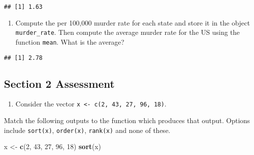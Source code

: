 \documentclass[
]{article}
\newenvironment{Shaded}{\begin{snugshade}}{\end{snugshade}}
\newcommand{\CommentTok}[1]{\textcolor[rgb]{0.56,0.35,0.01}{\textit{#1}}}
\newcommand{\DecValTok}[1]{\textcolor[rgb]{0.00,0.00,0.81}{#1}}
\newcommand{\KeywordTok}[1]{\textcolor[rgb]{0.13,0.29,0.53}{\textbf{#1}}}
\newcommand{\NormalTok}[1]{#1}
\newcommand{\OperatorTok}[1]{\textcolor[rgb]{0.81,0.36,0.00}{\textbf{#1}}}
\newcommand{\StringTok}[1]{\textcolor[rgb]{0.31,0.60,0.02}{#1}}
\providecommand{\tightlist}{%
  \setlength{\itemsep}{0pt}\setlength{\parskip}{0pt}}
\begin{document}
\begin{verbatim}
## [1] 1.63
\end{verbatim}

\begin{enumerate}
\def\labelenumi{\arabic{enumi}.}
\setcounter{enumi}{2}
\tightlist
\item
  Compute the per 100,000 murder rate for each state and store it in the
  object \texttt{murder\_rate}. Then compute the average murder rate for
  the US using the function \texttt{mean}. What is the average?
\end{enumerate}

\begin{Shaded}
\end{Shaded}

\begin{verbatim}
## [1] 2.78
\end{verbatim}

\hypertarget{section-2-assessment}{%
\subsection{Section 2 Assessment}\label{section-2-assessment}}

\begin{enumerate}
\def\labelenumi{\arabic{enumi}.}
\tightlist
\item
  Consider the vector
  \texttt{x\ \textless{}-\ c(2,\ 43,\ 27,\ 96,\ 18)}.
\end{enumerate}

Match the following outputs to the function which produces that output.
Options include \texttt{sort(x)}, \texttt{order(x)}, \texttt{rank(x)}
and none of these.

\begin{Shaded}
\begin{Highlighting}[]
\NormalTok{x <-}\StringTok{ }\KeywordTok{c}\NormalTok{(}\DecValTok{2}\NormalTok{, }\DecValTok{43}\NormalTok{, }\DecValTok{27}\NormalTok{, }\DecValTok{96}\NormalTok{, }\DecValTok{18}\NormalTok{)}
\KeywordTok{sort}\NormalTok{(x)}
\end{Highlighting}
\end{Shaded}
\end{document}
